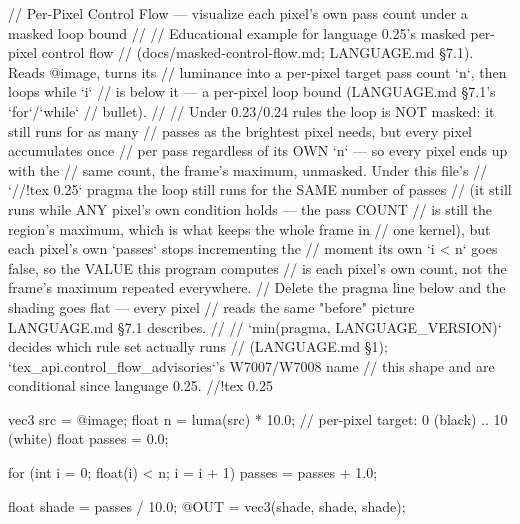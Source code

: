 // Per-Pixel Control Flow — visualize each pixel's own pass count under a masked loop bound
//
// Educational example for language 0.25's masked per-pixel control flow
// (docs/masked-control-flow.md; LANGUAGE.md §7.1). Reads @image, turns its
// luminance into a per-pixel target pass count `n`, then loops while `i`
// is below it — a per-pixel loop bound (LANGUAGE.md §7.1's `for`/`while`
// bullet).
//
// Under 0.23/0.24 rules the loop is NOT masked: it still runs for as many
// passes as the brightest pixel needs, but every pixel accumulates once
// per pass regardless of its OWN `n` — so every pixel ends up with the
// same count, the frame's maximum, unmasked. Under this file's
// `//!tex 0.25` pragma the loop still runs for the SAME number of passes
// (it still runs while ANY pixel's own condition holds — the pass COUNT
// is still the region's maximum, which is what keeps the whole frame in
// one kernel), but each pixel's own `passes` stops incrementing the
// moment its own `i < n` goes false, so the VALUE this program computes
// is each pixel's own count, not the frame's maximum repeated everywhere.
// Delete the pragma line below and the shading goes flat — every pixel
// reads the same "before" picture LANGUAGE.md §7.1 describes.
//
// `min(pragma, LANGUAGE_VERSION)` decides which rule set actually runs
// (LANGUAGE.md §1); `tex_api.control_flow_advisories`'s W7007/W7008 name
// this shape and are conditional since language 0.25.
//!tex 0.25

vec3 src = @image;
float n = luma(src) * 10.0;   // per-pixel target: 0 (black) .. 10 (white)
float passes = 0.0;

for (int i = 0; float(i) < n; i = i + 1) {
    passes = passes + 1.0;
}

float shade = passes / 10.0;
@OUT = vec3(shade, shade, shade);
